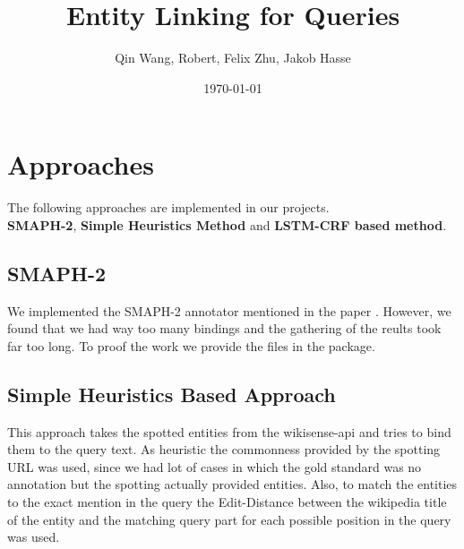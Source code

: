 \documentclass{article}
\begin{document}
\title{Entity Linking for Queries} %
\author{Qin Wang, Robert, Felix Zhu, Jakob Hasse} %

\date{\today} %

\maketitle %
%


\section{Approaches}
The following approaches are implemented in our projects.\\
{\bf SMAPH-2}, {\bf Simple Heuristics Method} and {\bf LSTM-CRF based method}.

\subsection{SMAPH-2}
We implemented the SMAPH-2 annotator mentioned in the paper \cite{SMAPH}.
However, we found that we had way too many bindings and the gathering of the reults took far too long. 
To proof the work we provide the files in the package.

\subsection{Simple Heuristics Based Approach}
This approach takes the spotted entities from the wikisense-api and tries to bind them to the query text.
As heuristic the commonness provided by the spotting URL was used, since we had lot of cases in which the gold standard was no annotation but the spotting actually provided entities.
Also, to match the entities to the exact mention in the query the Edit-Distance between the wikipedia title of the entity and the matching query part for each possible position in the query was used.
\end{document}
